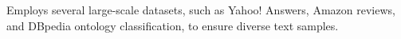 Employs several large-scale datasets, such as Yahoo! Answers, Amazon reviews, and DBpedia ontology classification, to ensure diverse text samples.

